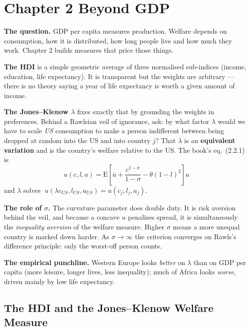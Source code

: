 \documentclass[12pt, letterpaper]{article}
\newcommand{\E}{\mathrm{E}}
\begin{document}
\section{Chapter 2 \quad Beyond GDP}

\begin{tcolorbox}[theorybox,title={Chapter 2 Overview}]
\textbf{The question.} GDP per capita measures production. Welfare depends on consumption,
how it is distributed, how long people live and how much they work. Chapter 2 builds
measures that price those things.

\medskip
\textbf{The HDI} is a simple geometric average of three normalised sub-indices (income,
education, life expectancy). It is transparent but the weights are arbitrary --- there is no
theory saying a year of life expectancy is worth a given amount of income.

\medskip
\textbf{The Jones--Klenow $\lambda$} fixes exactly that by grounding the weights in
preferences. Behind a Rawlsian veil of ignorance, ask: by what factor $\lambda$ would we have
to scale \emph{US} consumption to make a person indifferent between being dropped at random
into the US and into country $j$? That $\lambda$ is an \textbf{equivalent variation} and is
the country's welfare relative to the US. The book's eq.\ (2.2.1) is
$$u(c,l,a) = \E\left[\bar u + \frac{c^{1-\sigma}}{1-\sigma} - \theta(1-l)^2\right] a$$
and $\lambda$ solves $\;u(\lambda c_{US}, l_{US}, a_{US}) = u(c_j, l_j, a_j)$.

\medskip
\textbf{The role of $\sigma$.} The curvature parameter does double duty. It is risk aversion
behind the veil, and because a concave $u$ penalises spread, it is simultaneously the
\emph{inequality aversion} of the welfare measure. Higher $\sigma$ means a more unequal
country is marked down harder. As $\sigma \to \infty$ the criterion converges on Rawls's
difference principle: only the worst-off person counts.

\medskip
\textbf{The empirical punchline.} Western Europe looks \emph{better} on $\lambda$ than on
GDP per capita (more leisure, longer lives, less inequality); much of Africa looks
\emph{worse}, driven mainly by low life expectancy.
\end{tcolorbox}

\subsection{The HDI and the Jones--Klenow Welfare Measure}
\end{document}
